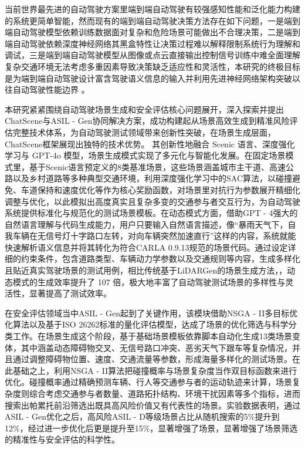 当前世界最先进的自动驾驶方案里端到端自动驾驶有较强感知性能和泛化能力构建的系统更简单智能，然而现有的端到端自动驾驶决策方法存在如下问题，一是端到端自动驾驶模型依赖训练数据面对复杂和危险场景可能做出不合理决策，二是端到端自动驾驶依赖深度神经网络其黑盒特性让决策过程难以解释限制系统行为理解和调试，三是端到端自动驾驶模型从图像或点云直接输出控制信号训练中难全面理解复杂交通环境无法考虑多重因素导致决策缺乏适应性和灵活性，本研究的终极目标是为端到端自动驾驶设计富含驾驶语义信息的输入并利用先进神经网络架构突破以往自动驾驶性能边界 。

本研究紧紧围绕自动驾驶场景生成和安全评估核心问题展开，深入探索并提出ChatScene与ASIL - Gen协同解决方案，成功构建起从场景高效生成到精准风险评估完整技术体系，为自动驾驶测试领域带来创新性突破，在场景生成层面，ChatScene框架展现出独特的技术优势。
其创新性地融合 Scenic 语言、深度强化学习与 GPT-4o 模型，场景生成模式实现了多元化与智能化发展。在固定场景模式里，基于Scenic语言预定义的8类基准场景，这些场景涵盖城市主干道、高速公路以及乡村道路等多种典型交通环境，利用深度强化学习中的SAC算法，以碰撞避免、车道保持和速度优化等作为核心奖励函数，对场景里对抗行为参数展开精细化调整与优化，以此模拟出高度真实且复杂多变的交通参与者交互行为，为自动驾驶系统提供标准化与规范化的测试场景模板。在动态模式方面，借助GPT - 4强大的自然语言理解与代码生成能力，用户只要输入自然语言描述，像“暴雨天气下，自我车辆在无信号灯十字路口左转，对向车辆突然加速直行”这样的内容，系统就能快速解析语义信息并将其转化为符合CARLA 0.9.13规范的场景代码。通过设定详细的约束条件，包含道路类型、车辆动力学参数以及交通规则等内容，生成多样化且贴近真实驾驶场景的测试用例，相比传统基于LiDARGen的场景生成方法，，动态模式的生成效率提升了 107 倍，极大地丰富了自动驾驶测试场景的多样性与灵活性，显著提高了测试效率\cite{焦准2006基于证据理论的多传感器信息融合目标识别方法}。​

在安全评估领域当中ASIL - Gen起到了关键作用，该模块借助NSGA - II多目标优化算法以及基于ISO 26262标准的量化评估模型，达成了场景的优化筛选与科学分类工作。在场景生成这个阶段，基于基础场景模板依靠脚本自动化生成13类场景变体，其中涵盖动态障碍物交叉、无信号路口冲突、恶劣天气下跟车等复杂情况，并且通过调整障碍物位置、速度、交通流量等参数，形成海量多样化的测试场景。在此基础之上，利用NSGA - II算法把碰撞概率与场景复杂度当作双目标函数来进行优化。碰撞概率通过精确预测车辆、行人等交通参与者的运动轨迹来计算，场景复杂度则综合考虑交通参与者数量、道路拓扑结构、环境干扰因素等多个指标，进而搜索出帕累托前沿筛选出既具高风险价值又有代表性的场景。实验数据表明，通过ASIL - Gen优化之后，高风险ASIL - D等级场景占比从随机搜索的5\%提升到12\%，经过进一步优化后更是提升至15\%，显著增强了场景，显著增强了场景筛选的精准性与安全评估的科学性。​

